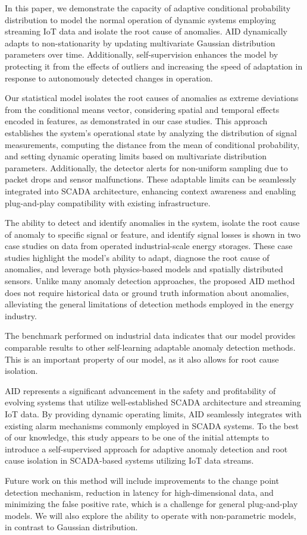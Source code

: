 In this paper, we demonstrate the capacity of adaptive conditional probability distribution to model the normal operation of dynamic systems employing streaming IoT data and isolate the root cause of anomalies. AID dynamically adapts to non-stationarity by updating multivariate Gaussian distribution parameters over time. Additionally, self-supervision enhances the model by protecting it from the effects of outliers and increasing the speed of adaptation in response to autonomously detected changes in operation.

Our statistical model isolates the root causes of anomalies as extreme deviations from the conditional means vector, considering spatial and temporal effects encoded in features, as demonstrated in our case studies. This approach establishes the system's operational state by analyzing the distribution of signal measurements, computing the distance from the mean of conditional probability, and setting dynamic operating limits based on multivariate distribution parameters. Additionally, the detector alerts for non-uniform sampling due to packet drops and sensor malfunctions. These adaptable limits can be seamlessly integrated into SCADA architecture, enhancing context awareness and enabling plug-and-play compatibility with existing infrastructure.

The ability to detect and identify anomalies in the system, isolate the root cause of anomaly to specific signal or feature, and identify signal losses is shown in two case studies on data from operated industrial-scale energy storages. These case studies highlight the model's ability to adapt, diagnose the root cause of anomalies, and leverage both physics-based models and spatially distributed sensors. Unlike many anomaly detection approaches, the proposed AID method does not require historical data or ground truth information about anomalies, alleviating the general limitations of detection methods employed in the energy industry.

The benchmark performed on industrial data indicates that our model provides comparable results to other self-learning adaptable anomaly detection methods. This is an important property of our model, as it also allows for root cause isolation.

AID represents a significant advancement in the safety and profitability of evolving systems that utilize well-established SCADA architecture and streaming IoT data. By providing dynamic operating limits, AID seamlessly integrates with existing alarm mechanisms commonly employed in SCADA systems. To the best of our knowledge, this study appears to be one of the initial attempts to introduce a self-supervised approach for adaptive anomaly detection and root cause isolation in SCADA-based systems utilizing IoT data streams.

Future work on this method will include improvements to the change point detection mechanism, reduction in latency for high-dimensional data, and minimizing the false positive rate, which is a challenge for general plug-and-play models. We will also explore the ability to operate with non-parametric models, in contrast to Gaussian distribution.
